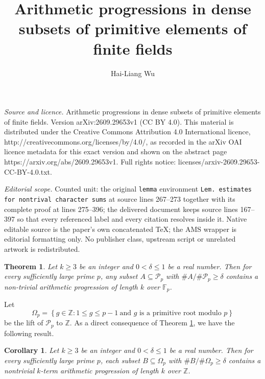 \documentclass[10pt,a4paper]{amsart}
\newtheorem{theorem}{Theorem}[section]
\newtheorem{corollary}{Corollary}
\begin{document}
\title[Arithmetic progressions in dense subsets of primitive elemen]{Arithmetic progressions in dense subsets of primitive elements of finite fields}
\author{Hai-Liang Wu}
\date{}
\maketitle
\noindent\emph{Source and licence.} Arithmetic progressions in dense subsets of primitive elements of finite fields. Version arXiv:2609.29653v1 (CC BY 4.0). This material is distributed under the Creative Commons Attribution 4.0 International licence, http://creativecommons.org/licenses/by/4.0/, as recorded in the arXiv OAI licence metadata for this exact version and shown on the abstract page https://arxiv.org/abs/2609.29653v1. Full rights notice: licenses/arxiv-2609.29653-CC-BY-4.0.txt.\par\smallskip
\noindent\textit{Editorial scope.} Counted unit: the original \texttt{lemma} environment \texttt{Lem. estimates for nontrival character sums} at source lines 267--273 together with its complete proof at lines 275--396; the delivered document keeps source lines 167--397 so that every referenced label and every citation resolves inside it. Native editable source is the paper's own concatenated TeX; the AMS wrapper is editorial formatting only. No publisher class, upstream script or unrelated artwork is redistributed.
	\begin{theorem}\label{Thm. A}
		Let $k\ge3$ be an integer and $0<\delta\le 1$ be a real number. Then for every sufficiently large prime $p$, any subset $A\subseteq\mathcal{P}_p$ with $\#A/\#\mathcal{P}_p\ge \delta$ contains a non-trivial arithmetic progression of length $k$ over $\mathbb{F}_p$. 
	\end{theorem}
	
	Let 
	$$\Omega_p=\left\{g\in\mathbb{Z}: 1\le g\le p-1\ \text{and $g$ is a primitive root modulo $p$}\right\}$$
	be the lift of $\mathcal{P}_p$ to $\mathbb{Z}$. As a direct consequence of Theorem \ref{Thm. A}, we have the following result.
	
	\begin{corollary}\label{Corollary of Thm. A}
		Let $k\ge3$ be an integer and $0<\delta\le 1$ be a real number. Then for every sufficiently large prime $p$, each subset $B\subseteq\Omega_p$ with $\#B/\#\Omega_p\ge\delta$ contains a nontrivial $k$-term arithmetic progression of length $k$ over $\mathbb{Z}$. 
	\end{corollary}
		
		
		
\end{document}
